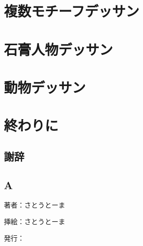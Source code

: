 \documentclass[a4paper,11pt]{jsbook}
\begin{document}
\part{複数モチーフデッサン}

\part{石膏人物デッサン}

\part{動物デッサン}

\part{終わりに}
\chapter{謝辞}

\appendix
\chapter{A}




\thispagestyle{empty}
\begin{flushright}
\begin{minipage}{0.5\hsize}
\begin{description}
  \item{著者：}さとうとーま
  \item{挿絵：}さとうとーま
  \item{発行：}\date{\today}
\end{description}
\end{minipage}
\end{flushright}
\end{document}
